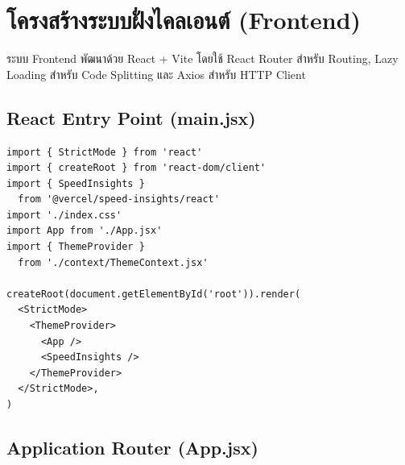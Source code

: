 \section{โครงสร้างระบบฝั่งไคลเอนต์ (Frontend)}

\hspace*{1.3em}
ระบบ Frontend พัฒนาด้วย React + Vite โดยใช้ React Router สำหรับ Routing, Lazy Loading สำหรับ Code Splitting และ Axios สำหรับ HTTP Client

\subsection{React Entry Point (main.jsx)}

\begin{lstlisting}[language=JSX, caption={frontend/src/main.jsx -- React Application Entry}]
import { StrictMode } from 'react'
import { createRoot } from 'react-dom/client'
import { SpeedInsights }
  from '@vercel/speed-insights/react'
import './index.css'
import App from './App.jsx'
import { ThemeProvider }
  from './context/ThemeContext.jsx'

createRoot(document.getElementById('root')).render(
  <StrictMode>
    <ThemeProvider>
      <App />
      <SpeedInsights />
    </ThemeProvider>
  </StrictMode>,
)
\end{lstlisting}

\subsection{Application Router (App.jsx)}

